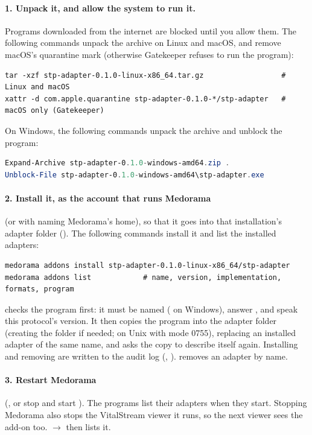 \paragraph{1. Unpack it, and allow the system to run it.} Programs downloaded from the internet
are blocked until you allow them. The following commands unpack the archive on Linux and macOS,
and remove macOS's quarantine mark (otherwise Gatekeeper refuses to run the program):
\begin{lstlisting}[style=shell]
tar -xzf stp-adapter-0.1.0-linux-x86_64.tar.gz                  # Linux and macOS
xattr -d com.apple.quarantine stp-adapter-0.1.0-*/stp-adapter   # macOS only (Gatekeeper)
\end{lstlisting}
On Windows, the following commands unpack the archive and unblock the program:
\begin{lstlisting}[language=PowerShell]
Expand-Archive stp-adapter-0.1.0-windows-amd64.zip .
Unblock-File stp-adapter-0.1.0-windows-amd64\stp-adapter.exe
\end{lstlisting}

\paragraph{2. Install it, as the account that runs Medorama} (or with  naming
Medorama's home), so that it goes into that installation's adapter folder (). The
following commands install it and list the installed adapters:
\begin{lstlisting}[style=shell]
medorama addons install stp-adapter-0.1.0-linux-x86_64/stp-adapter
medorama addons list            # name, version, implementation, formats, program
\end{lstlisting}
 checks the program first: it must be named 
( on Windows), answer , and speak this protocol's version. It then
copies the program into the adapter folder (creating the folder if needed; on Unix with mode
0755), replacing an installed adapter of the same name, and asks the copy to describe itself
again. Installing and removing are written to the audit log (,
).  removes an adapter by name.

\paragraph{3. Restart Medorama} (, or stop and start
). The programs list their adapters when they start. Stopping Medorama also
stops the VitalStream viewer it runs, so the next viewer sees the add-on too. 
$\rightarrow$  then lists it.

